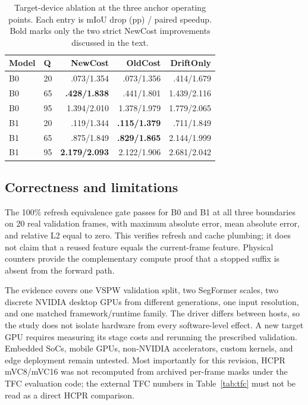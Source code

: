 \documentclass[runningheads]{llncs}
\begin{document}
\begin{table}[t]
\centering
\caption{Target-device ablation at the three anchor operating points. Each entry is mIoU drop (pp) / paired speedup. Bold marks only the two strict NewCost improvements discussed in the text.}
\label{tab:ablation}
\small
\setlength{\tabcolsep}{2.5pt}
\begin{tabular}{llrrr}
\toprule
Model & Q & NewCost & OldCost & DriftOnly \\
\midrule
B0 & 20 & .073/1.354 & .073/1.356 & .414/1.679 \\
B0 & 65 & \textbf{.428/1.838} & .441/1.801 & 1.439/2.116 \\
B0 & 95 & 1.394/2.010 & 1.378/1.979 & 1.779/2.065 \\
B1 & 20 & .119/1.344 & \textbf{.115/1.379} & .711/1.849 \\
B1 & 65 & .875/1.849 & \textbf{.829/1.865} & 2.144/1.999 \\
B1 & 95 & \textbf{2.179/2.093} & 2.122/1.906 & 2.681/2.042 \\
\bottomrule
\end{tabular}
\end{table}

\subsection{Correctness and limitations}
The 100\% refresh equivalence gate passes for B0 and B1 at all three boundaries on 20 real validation frames, with maximum absolute error, mean absolute error, and relative L2 equal to zero. This verifies refresh and cache plumbing; it does not claim that a reused feature equals the current-frame feature. Physical counters provide the complementary compute proof that a stopped suffix is absent from the forward path.

The evidence covers one VSPW validation split, two SegFormer scales, two discrete NVIDIA desktop GPUs from different generations, one input resolution, and one matched framework/runtime family. The driver differs between hosts, so the study does not isolate hardware from every software-level effect. A new target GPU requires measuring its stage costs and rerunning the prescribed validation. Embedded SoCs, mobile GPUs, non-NVIDIA accelerators, custom kernels, and edge deployment remain untested. Most importantly for this revision, HCPR mVC8/mVC16 was not recomputed from archived per-frame masks under the TFC evaluation code; the external TFC numbers in Table~\ref{tab:tfc} must not be read as a direct HCPR comparison.
\end{document}
